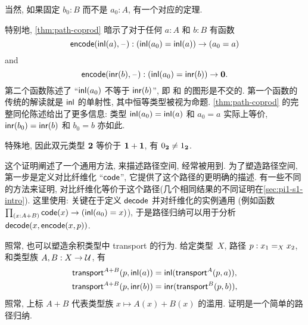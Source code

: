 \noindent
当然, 如果固定 $b_0:B$ 而不是 $a_0:A$, 有一个对应的定理.

特别地, \cref{thm:path-coprod} 暗示了对于任何 $a : A$ 和 $b : B$ 有函数
%
\[ \encode(\inl(a), {\blank}) : (\inl(a_0)=\inl(a)) \to (a_0=a)\]
%
and
%
\[ \encode(\inr(b), {\blank}) : (\inl(a_0)=\inr(b)) \to \emptyt. \]
%
第二个函数陈述了 ``$\inl(a_0)$ 不等于 $\inr(b)$'', 即 \inl 和 \inr 的图形是不交的.
第一个函数的传统的解读就是 $\inl$ 的单射性, 其中恒等类型被视为命题.
\cref{thm:path-coprod} 的完整同伦陈述给出了更多信息: 类型 $\inl(a_0)=\inl(a)$ 和 $a_0=a$ 实际上等价, $\inr(b_0)=\inr(b)$ 和 $b_0=b$ 亦如此.

\begin{rmk}\label{rmk:true-neq-false}
特殊地, 因此双元类型 $\bool$ 等价于 $\unit+\unit$, 有 $\bfalse\neq\btrue$.
\end{rmk}

这个证明阐述了一个通用方法, 来描述路径空间, 经常被用到. 为了塑造路径空间, 第一步是定义对比纤维化 ``$\code$'', 它提供了这个路径的更明确的描述.
有一些不同的方法来证明, 对比纤维化等价于这个路径(几个相同结果的不同证明在\cref{sec:pi1-s1-intro}).
这里使用:
关键在于定义 $\decode$ 并对纤维化的实例通用 (例如函数 $\prd{x:A+B} \code(x) \to (\inl(a_0)=x)$), 于是路径归纳可以用于分析 $\decode(x,\encode(x,p))$.

%
照常, 也可以塑造余积类型中 transport 的行为.
给定类型~$X$, 路径 $p:\id[X]{x_1}{x_2}$, 和类型族 $A,B:X\to\type$, 有
\begin{align*}
  \transfib{A+B}{p}{\inl(a)} &= \inl (\transfib{A}{p}{a}),\\
  \transfib{A+B}{p}{\inr(b)} &= \inr (\transfib{B}{p}{b}),
\end{align*}
照常, 上标 $A+B$ 代表类型族 $x\mapsto A(x)+B(x)$ 的滥用.
证明是一个简单的路径归纳.

%
%